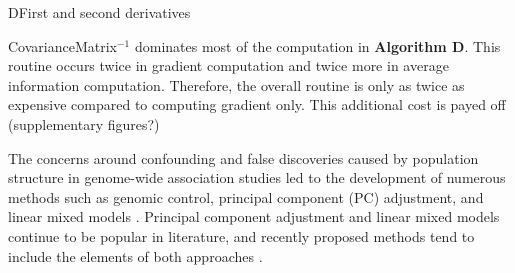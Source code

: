 \begin{taocpalg}{D}{First and second derivatives}

\end{taocpalg}

\textsf{CovarianceMatrix}$^{-1}$ dominates most of the computation in \textbf{Algorithm D}.
This routine occurs twice in gradient computation and twice more in average information computation.
Therefore, the overall routine is only as twice as expensive compared to computing gradient only.
This additional cost is payed off (supplementary figures?)


The concerns around confounding and false discoveries caused by population structure in genome-wide association studies led to the development of
numerous methods such as genomic control, principal component (PC) adjustment, and linear mixed models \citep{devlin1999genomiccontrol, price2006eigenstrat, kang2010variancecomponent}.
Principal component adjustment and linear mixed models continue to be popular in literature,
and recently proposed methods tend to include the elements of both approaches \citep{loh2015boltlmm, jiang2019fastgwa}.

